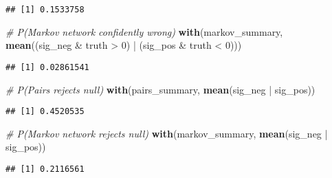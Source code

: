\documentclass[11pt,]{article}
\newenvironment{Shaded}{\begin{snugshade}}{\end{snugshade}}
\newcommand{\KeywordTok}[1]{\textcolor[rgb]{0.13,0.29,0.53}{\textbf{{#1}}}}
\newcommand{\DataTypeTok}[1]{\textcolor[rgb]{0.13,0.29,0.53}{{#1}}}
\newcommand{\DecValTok}[1]{\textcolor[rgb]{0.00,0.00,0.81}{{#1}}}
\newcommand{\StringTok}[1]{\textcolor[rgb]{0.31,0.60,0.02}{{#1}}}
\newcommand{\CommentTok}[1]{\textcolor[rgb]{0.56,0.35,0.01}{\textit{{#1}}}}
\newcommand{\NormalTok}[1]{{#1}}
\begin{document}
\begin{verbatim}
## [1] 0.1533758
\end{verbatim}

\begin{Shaded}
\begin{Highlighting}[]
\CommentTok{# P(Markov network confidently wrong)}
\KeywordTok{with}\NormalTok{(markov_summary, }\KeywordTok{mean}\NormalTok{((sig_neg &}\StringTok{ }\NormalTok{truth >}\StringTok{ }\DecValTok{0}\NormalTok{) |}\StringTok{ }\NormalTok{(sig_pos &}\StringTok{ }\NormalTok{truth <}\StringTok{ }\DecValTok{0}\NormalTok{)))}
\end{Highlighting}
\end{Shaded}

\begin{verbatim}
## [1] 0.02861541
\end{verbatim}

\begin{Shaded}
\begin{Highlighting}[]
\CommentTok{# P(Pairs rejects null)}
\KeywordTok{with}\NormalTok{(pairs_summary,  }\KeywordTok{mean}\NormalTok{(sig_neg |}\StringTok{ }\NormalTok{sig_pos))}
\end{Highlighting}
\end{Shaded}

\begin{verbatim}
## [1] 0.4520535
\end{verbatim}

\begin{Shaded}
\begin{Highlighting}[]
\CommentTok{# P(Markov network rejects null)}
\KeywordTok{with}\NormalTok{(markov_summary,  }\KeywordTok{mean}\NormalTok{(sig_neg |}\StringTok{ }\NormalTok{sig_pos))}
\end{Highlighting}
\end{Shaded}

\begin{verbatim}
## [1] 0.2116561
\end{verbatim}

\begin{Shaded}
\end{Shaded}
\end{document}
